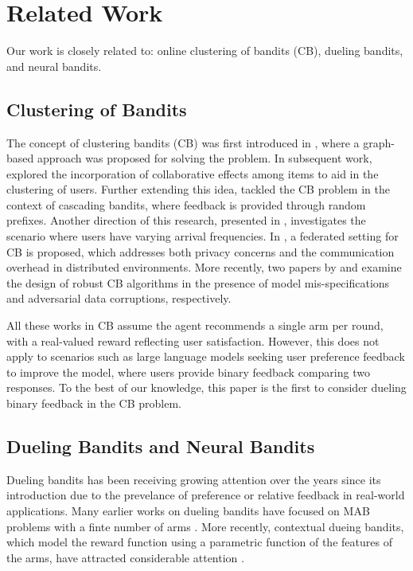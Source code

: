 \vspace{-1.5mm}
\section{Related Work}
\vspace{-1.5mm}
Our work is closely related to: online clustering of bandits (CB), dueling bandits, and neural bandits.

\subsection{Clustering of Bandits}
The concept of clustering bandits (CB) was first introduced in \cite{gentile2014online}, where a graph-based approach was proposed for solving the problem. In subsequent work, \cite{li2016collaborative} explored the incorporation of collaborative effects among items to aid in the clustering of users. Further extending this idea, \cite{li2018online} tackled the CB problem in the context of cascading bandits, where feedback is provided through random prefixes. Another direction of this research, presented in \cite{10.5555/3367243.3367445}, investigates the scenario where users have varying arrival frequencies. In \cite{liu2022federated}, a federated setting for CB is proposed, which addresses both privacy concerns and the communication overhead in distributed environments. More recently, two papers by \cite{wang2024onlinea} and \cite{wang2024onlineb} examine the design of robust CB algorithms in the presence of model mis-specifications and adversarial data corruptions, respectively.

All these works in CB assume the agent recommends a single arm per round, with a real-valued reward reflecting user satisfaction. However, this does not apply to scenarios such as large language models seeking user preference feedback to improve the model, where users provide binary feedback comparing two responses. To the best of our knowledge, this paper is the first to consider dueling binary feedback in the CB problem.

\subsection{Dueling Bandits and Neural Bandits}
Dueling bandits has been receiving growing attention over the years since its introduction \cite{ICML09_yue2009interactively,ICML11_yue2011beat,JCSS12_yue2012k} due to the prevelance of preference or relative feedback in real-world applications.
Many earlier works on dueling bandits have focused on MAB problems with a finte number of arms \cite{WSDM14_zoghi2014relative,ICML14_ailon2014reducing,ICML14_zoghi2014relative,COLT15_komiyama2015regret,ICML15_gajane2015relative,UAI18_saha2018battle,AISTATS19_saha2019active,ALT19_saha2019pac,AISTATS22_saha2022exploiting,ICML23_zhu2023principled}.
More recently, contextual dueing bandits, which model the reward function using a parametric function of the features of the arms, have attracted considerable attention \cite{NeurIPS21_saha2021optimal,ALT22_saha2022efficient,ICML22_bengs2022stochastic,arXiv23_di2023variance,arXiv24_li2024feelgood,verma2024neural}.

